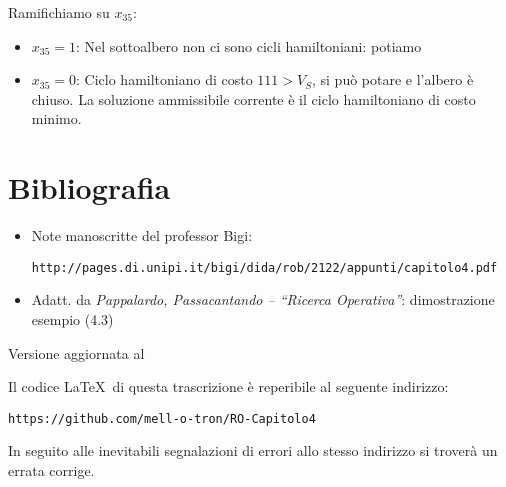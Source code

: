\documentclass[a4paper,11pt]{book}
\theoremstyle{break}
\begin{document}
Ramifichiamo su $x_{35}$:
\begin{itemize}
 \item $x_{35} = 1$: Nel sottoalbero non ci sono cicli hamiltoniani: potiamo
 \item $x_{35} = 0$: Ciclo hamiltoniano di costo $111>V_S$, si può potare e l'albero è chiuso. La soluzione ammissibile corrente è il ciclo hamiltoniano di costo minimo.
\end{itemize}

  \begin{center}

    \smallskip
    
    
\end{center}

\newpage
\pagestyle{empty}
\section*{Bibliografia}

\begin{itemize}
 \item Note manoscritte del professor Bigi: 
 
 \texttt{http://pages.di.unipi.it/bigi/dida/rob/2122/appunti/capitolo4.pdf}
 
 \item Adatt. da \emph{Pappalardo, Passacantando -- ``Ricerca Operativa''}: dimostrazione esempio (4.3)
\end{itemize}\bigskip

\vspace*{\fill}
Versione aggiornata al \smallskip

Il codice \LaTeX \, di questa trascrizione è reperibile al seguente indirizzo:\medskip


\texttt{https://github.com/mell-o-tron/RO-Capitolo4}\medskip

In seguito alle inevitabili segnalazioni di errori allo stesso indirizzo si troverà un errata corrige.
\end{document}
